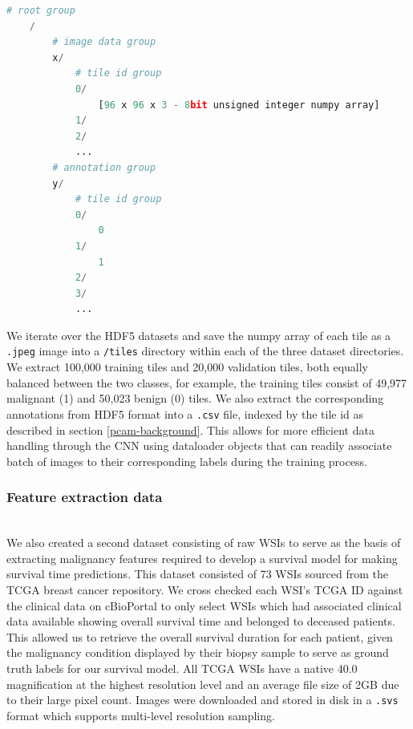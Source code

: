 \documentclass{l4proj}
\begin{document}
\begin{lstlisting}[language=python, caption={PCAM Data HDF5 schema - Each set has a group labeled 'x' - containing all the tiles as numpy arrays of 8-bit unsigned integers. Each array has a unique id (0, 1, 2...) and shape \(96 \times 96 \times 3\) indicating a \(96 \times 96\)px RGB tile. The second group labeled 'y' contains the annotations for each tile. The annotations are shown as binary labels against each tile id. }, label= lst:pcam-hdf5]
    # root group
    /
        # image data group
        x/
            # tile id group
            0/
                [96 x 96 x 3 - 8bit unsigned integer numpy array]
            1/
            2/
            ...
        # annotation group
        y/
            # tile id group
            0/
                0
            1/
                1
            2/
            3/
            ...
\end{lstlisting}

We iterate over the HDF5 datasets and save the numpy array of each tile as a \texttt{.jpeg} image into a \texttt{/tiles} directory within each of the three dataset directories. We extract 100,000 training tiles and 20,000 validation tiles, both equally balanced between the two classes, for example, the training tiles consist of 49,977 malignant (1) and 50,023 benign (0) tiles. We also extract the corresponding annotations from HDF5 format into a \texttt{.csv} file, indexed by the tile id as described in section \ref{pcam-background}. This allows for more efficient data handling through the CNN using dataloader objects that can readily associate batch of images to their corresponding labels during the training process. 

\subsubsection{Feature extraction data}\hfill\\
We also created a second dataset consisting of raw WSIs to serve as the basis of extracting malignancy features required to develop a survival model for making survival time predictions. This dataset consisted of 73 WSIs sourced from the TCGA breast cancer repository. We cross checked each WSI's TCGA ID against the clinical data on cBioPortal to only select WSIs which had associated clinical data available showing overall survival time and belonged to deceased patients. This allowed us to retrieve the overall survival duration for each patient, given the malignancy condition displayed by their biopsy sample to serve as ground truth labels for our survival model. All TCGA WSIs have a native 40.0 magnification at the highest resolution level and an average file size of 2GB due to their large pixel count. Images were downloaded and stored in disk in a \texttt{.svs} format which supports multi-level resolution sampling.  
\end{document}
